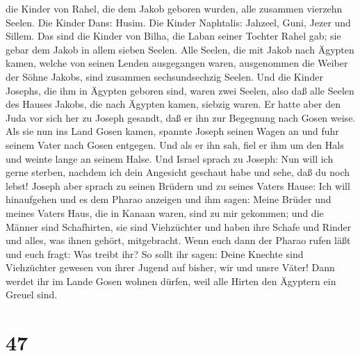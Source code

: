 die Kinder von Rahel, die dem Jakob geboren wurden, alle zusammen
vierzehn Seelen.  Die Kinder Dans: Husim. 
Die Kinder Naphtalis: Jahzeel, Guni, Jezer und Sillem. 
Das sind die Kinder von Bilha, die Laban seiner Tochter Rahel gab; sie
gebar dem Jakob in allem sieben Seelen.  Alle Seelen, die
mit Jakob nach Ägypten kamen, welche von seinen Lenden ausgegangen
waren, ausgenommen die Weiber der Söhne Jakobs, sind zusammen
sechsundsechzig Seelen.  Und die Kinder Josephs, die ihm
in Ägypten geboren sind, waren zwei Seelen, also daß alle Seelen des
Hauses Jakobs, die nach Ägypten kamen, siebzig waren.  Er
hatte aber den Juda vor sich her zu Joseph gesandt, daß er ihn zur
Begegnung nach Gosen weise.  Als sie nun ins Land Gosen
kamen, spannte Joseph seinen Wagen an und fuhr seinem Vater nach Gosen
entgegen. Und als er ihn sah, fiel er ihm um den Hals und weinte lange
an seinem Halse.  Und Israel sprach zu Joseph: Nun will
ich gerne sterben, nachdem ich dein Angesicht geschaut habe und sehe,
daß du noch lebst!  Joseph aber sprach zu seinen Brüdern
und zu seines Vaters Hause: Ich will hinaufgehen und es dem Pharao
anzeigen und ihm sagen: Meine Brüder und meines Vaters Haus, die in
Kanaan waren, sind zu mir gekommen;  und die Männer sind
Schafhirten, sie sind Viehzüchter und haben ihre Schafe und Rinder und
alles, was ihnen gehört, mitgebracht.  Wenn euch dann der
Pharao rufen läßt und euch fragt: Was treibt ihr?  So
sollt ihr sagen: Deine Knechte sind Viehzüchter gewesen von ihrer Jugend
auf bisher, wir und unsre Väter! Dann werdet ihr im Lande Gosen wohnen
dürfen, weil alle Hirten den Ägyptern ein Greuel sind.

\hypertarget{section-46}{%
\section{47}\label{section-46}}

